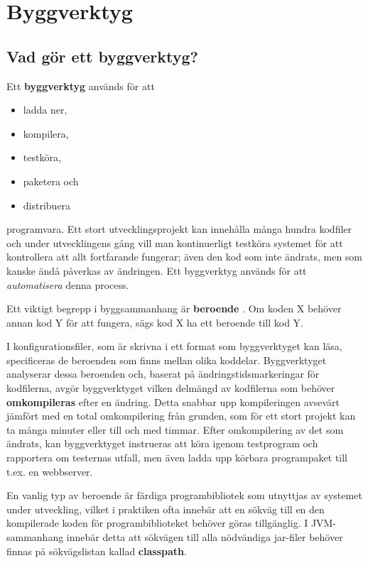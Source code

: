 
\newcommand{\sbt}{\texttt{sbt} }

\chapter{Byggverktyg}\label{appendix:build}

\section{Vad gör ett byggverktyg?}

Ett \textbf{byggverktyg}  används för att 
\begin{itemize}
\item ladda ner, 
\item kompilera, 
\item testköra, 
\item paketera och 
\item distribuera  
\end{itemize}
programvara. Ett stort utvecklingsprojekt kan innehålla många hundra kodfiler och under utvecklingens gång vill man kontinuerligt testköra systemet för att kontrollera att allt fortfarande fungerar; även den kod som inte ändrats, men som kanske ändå påverkas av ändringen. Ett byggverktyg används för att \textit{automatisera} denna process.

Ett viktigt begrepp i byggsammanhang är \textbf{beroende} . Om koden X behöver annan kod Y för att fungera, sägs kod X ha ett beroende till kod Y. 

I konfigurationsfiler, som är skrivna i ett format som byggverktyget kan läsa, specificeras de beroenden som finns mellan olika koddelar. Byggverktyget analyserar dessa beroenden och, baserat på ändringstidsmarkeringar för kodfilerna, avgör byggverktyget vilken delmängd av kodfilerna som behöver \textbf{omkompileras} efter en ändring. Detta snabbar upp kompileringen avsevärt jämfört med en total omkompilering från grunden, som för ett stort projekt kan ta många minuter eller till och med timmar. Efter omkompilering av det som ändrats, kan byggverktyget instrueras att köra igenom testprogram och rapportera om testernas utfall, men även ladda upp körbara programpaket till t.ex. en webbserver.


En vanlig typ av beroende är färdiga programbibliotek som utnyttjas av systemet under utveckling, vilket i praktiken ofta innebär att en sökväg till en den kompilerade koden för programbiblioteket behöver göras tillgänglig. I JVM-sammanhang innebär detta att sökvägen till alla nödvändiga jar-filer behöver finnas på sökvägslistan kallad \textbf{classpath}. 

